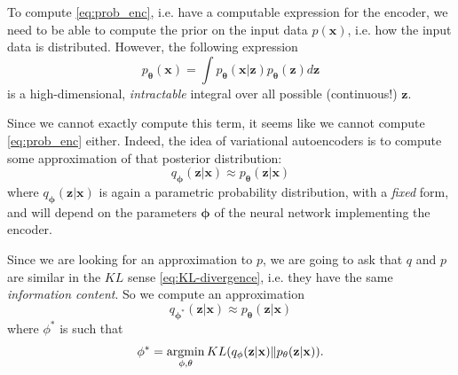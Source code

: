 To compute \cref{eq:prob_enc}, i.e. have a computable expression for the encoder, we need to be able to compute the prior on the input data $p(\mathbf{x})$, i.e. how the input data is distributed. However, the following expression
\begin{equation}
	p_\mathbf{\theta}(\mathbf{x}) = \int p_\mathbf{\theta}(\mathbf{x} | \mathbf{z})p_\mathbf{\theta}(\mathbf{z})d\mathbf{z}
\end{equation}
is a high-dimensional, \emph{intractable} integral over all possible (continuous!) $\mathbf{z}$. 

Since we cannot exactly compute this term, it seems like we cannot compute \cref{eq:prob_enc} either. Indeed, the idea of variational autoencoders is to compute some approximation of that posterior distribution:
\begin{equation}
	q_\mathbf{\phi}(\mathbf{z} | \mathbf{x}) \approx p_\mathbf{\theta}(\mathbf{z} | \mathbf{x})
\end{equation}
where $q_\mathbf{\phi}(\mathbf{z} | \mathbf{x})$ is again a parametric probability distribution, with a \emph{fixed} form, and will depend on the parameters $\mathbf{\phi}$ of the neural network implementing the encoder.

Since we are looking for an approximation to $p$, we are going to ask that $q$ and $p$ are similar in the $KL$ sense \cref{eq:KL-divergence}, i.e. they have the same \emph{information content}. So we compute an approximation 
\begin{equation}
    q_{\mathbf{\phi}^*}(\mathbf{z} | \mathbf{x}) \approx p_\mathbf{\theta}(\mathbf{z} | \mathbf{x})    
\end{equation}
where $\phi^*$ is such that
\begin{equation}\label{eq:opt_prob_enc}
	\mathbf{\phi}^* = \operatorname*{\operatorname{argmin}}_{\mathbf{\phi}, \mathbf{\theta}} KL(q_{\mathbf{\phi}}(\mathbf{z} | \mathbf{x}) \| p_\mathbf{\theta}(\mathbf{z} | \mathbf{x})).
\end{equation} 

